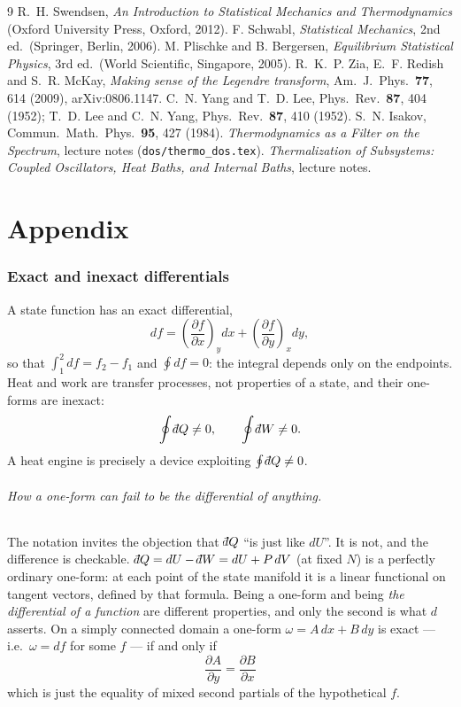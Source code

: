 \documentclass[10pt,a4paper]{article}
\theoremstyle{remark}
\newcommand{\dbar}{\mathchar'26\mkern-11mu d}
\begin{document}
\begin{thebibliography}{9}
 R.~H. Swendsen, \emph{An Introduction to Statistical
Mechanics and Thermodynamics} (Oxford University Press, Oxford, 2012).
 F. Schwabl, \emph{Statistical Mechanics}, 2nd ed.\
(Springer, Berlin, 2006).
 M. Plischke and B. Bergersen, \emph{Equilibrium Statistical
Physics}, 3rd ed.\ (World Scientific, Singapore, 2005).
 R.~K.~P. Zia, E.~F. Redish and S.~R. McKay, \emph{Making sense of
  the Legendre transform}, Am.\ J.\ Phys.\ \textbf{77}, 614 (2009),
  arXiv:0806.1147.
 C.~N. Yang and T.~D. Lee, Phys.\ Rev.\ \textbf{87}, 404
(1952); T.~D. Lee and C.~N. Yang, Phys.\ Rev.\ \textbf{87}, 410 (1952).
\bibitem{Isakov} S.~N. Isakov, Commun.\ Math.\ Phys.\ \textbf{95}, 427 (1984).
\bibitem{DOSNotes} \emph{Thermodynamics as a Filter on the Spectrum}, lecture
notes (\texttt{dos/thermo\_dos.tex}).
 \emph{Thermalization of Subsystems: Coupled Oscillators,
Heat Baths, and Internal Baths}, lecture notes.
\end{thebibliography}

\clearpage
\appendix
\part*{Appendix}


\section{Exact and inexact differentials}
\label{app:exact}

A state function has an exact differential,
\[
df=
\left(\frac{\partial f}{\partial x}\right)_y dx+
\left(\frac{\partial f}{\partial y}\right)_x dy,
\]
so that $\int_1^2 df=f_2-f_1$ and $\oint df=0$: the integral depends only on the
endpoints. Heat and work are transfer processes, not properties of a state, and
their one-forms are inexact:
\[
\oint\dbar Q\neq 0,\qquad \oint\dbar W\neq 0 .
\]
A heat engine is precisely a device exploiting $\oint\dbar Q\neq0$.

\paragraph{How a one-form can fail to be the differential of anything.} The
notation invites the objection that $\dbar Q$ ``is just like $dU$''. It is not,
and the difference is checkable. $\dbar Q=dU-\dbar W=dU+P\,dV$ (at fixed $N$) is
a perfectly ordinary one-form: at each point of the state manifold it is a linear
functional on tangent vectors, defined by that formula. Being a one-form and
being \emph{the differential of a function} are different properties, and only
the second is what $d$ asserts. On a simply connected domain a one-form
$\omega=A\,dx+B\,dy$ is exact --- i.e.\ $\omega=df$ for some $f$ --- if and only
if
\[
\;\frac{\partial A}{\partial y}=\frac{\partial B}{\partial x}\
\]
which is just the equality of mixed second partials of the hypothetical $f$.
\end{document}
